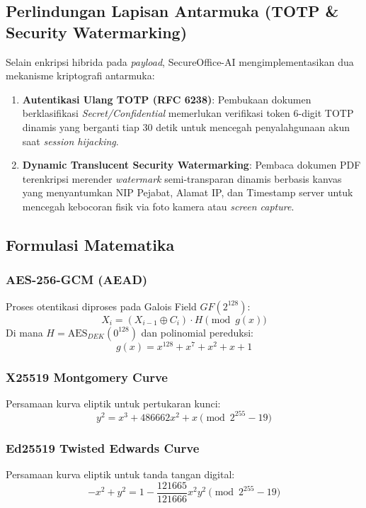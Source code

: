 \documentclass[conference]{IEEEtran}
\begin{document}
\subsection{Perlindungan Lapisan Antarmuka (TOTP \& Security Watermarking)}
Selain enkripsi hibrida pada \textit{payload}, SecureOffice-AI mengimplementasikan dua mekanisme kriptografi antarmuka:
\begin{enumerate}
    \item \textbf{Autentikasi Ulang TOTP (RFC 6238)}: Pembukaan dokumen berklasifikasi \textit{Secret/Confidential} memerlukan verifikasi token 6-digit TOTP dinamis yang berganti tiap 30 detik untuk mencegah penyalahgunaan akun saat \textit{session hijacking}.
    \item \textbf{Dynamic Translucent Security Watermarking}: Pembaca dokumen PDF terenkripsi merender \textit{watermark} semi-transparan dinamis berbasis kanvas yang menyantumkan NIP Pejabat, Alamat IP, dan Timestamp server untuk mencegah kebocoran fisik via foto kamera atau \textit{screen capture}.
\end{enumerate}

\subsection{Formulasi Matematika}
\subsubsection{AES-256-GCM (AEAD)}
Proses otentikasi diproses pada Galois Field $GF(2^{128})$:
\begin{equation}
X_i = (X_{i-1} \oplus C_i) \cdot H \pmod{g(x)}
\end{equation}
Di mana $H = \text{AES}_{DEK}(0^{128})$ dan polinomial pereduksi:
\begin{equation}
g(x) = x^{128} + x^7 + x^2 + x + 1
\end{equation}

\subsubsection{X25519 Montgomery Curve}
Persamaan kurva eliptik untuk pertukaran kunci:
\begin{equation}
y^2 = x^3 + 486662x^2 + x \pmod{2^{255} - 19}
\end{equation}

\subsubsection{Ed25519 Twisted Edwards Curve}
Persamaan kurva eliptik untuk tanda tangan digital:
\begin{equation}
-x^2 + y^2 = 1 - \frac{121665}{121666}x^2y^2 \pmod{2^{255} - 19}
\end{equation}
\end{document}

